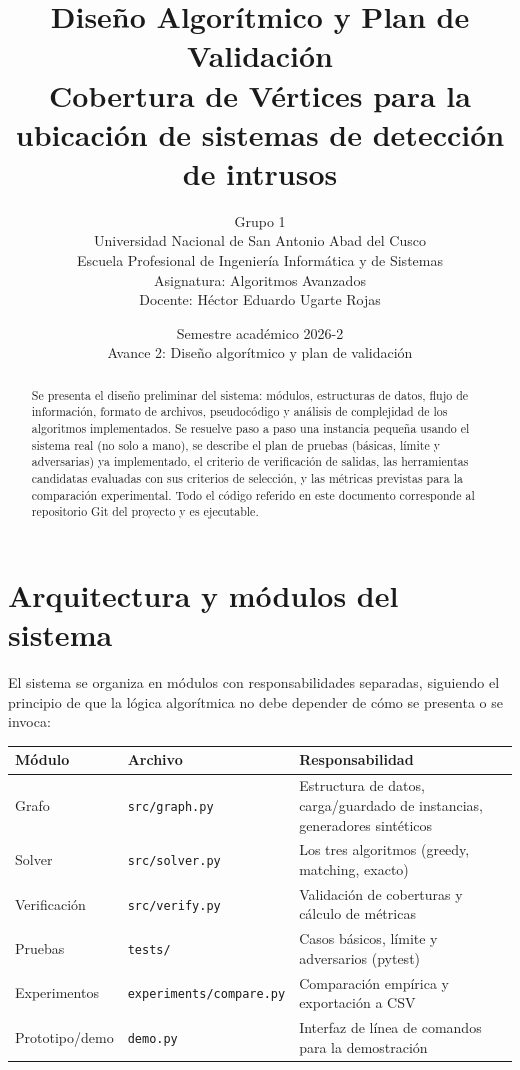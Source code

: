 \documentclass[11pt,a4paper]{article}
\title{
	\vspace{-1.5cm}
	\textbf{Diseño Algorítmico y Plan de Validación} \\
	\large Cobertura de Vértices para la ubicación de sistemas de detección de intrusos
}
\author{
	Grupo 1 \\
	\small Universidad Nacional de San Antonio Abad del Cusco \\
	\small Escuela Profesional de Ingeniería Informática y de Sistemas \\
	\small Asignatura: Algoritmos Avanzados \\
	\small Docente: Héctor Eduardo Ugarte Rojas
}
\date{Semestre académico 2026-2 \\ Avance 2: Diseño algorítmico y plan de validación}
\begin{document}
\maketitle
\thispagestyle{fancy}

\begin{abstract}
\noindent
Se presenta el diseño preliminar del sistema: módulos, estructuras de datos, flujo de
información, formato de archivos, pseudocódigo y análisis de complejidad de los algoritmos
implementados. Se resuelve paso a paso una instancia pequeña usando el sistema real (no solo
a mano), se describe el plan de pruebas (básicas, límite y adversarias) ya implementado, el
criterio de verificación de salidas, las herramientas candidatas evaluadas con sus criterios
de selección, y las métricas previstas para la comparación experimental. Todo el código
referido en este documento corresponde al repositorio Git del proyecto y es ejecutable.
\end{abstract}

\section{Arquitectura y módulos del sistema}

El sistema se organiza en módulos con responsabilidades separadas, siguiendo el principio de
que la lógica algorítmica no debe depender de cómo se presenta o se invoca:

\begin{center}
\begin{tabular}{p{2.6cm}p{3.6cm}p{7.5cm}}
	\toprule
	\textbf{Módulo} & \textbf{Archivo} & \textbf{Responsabilidad} \\
	\midrule
	Grafo & \texttt{src/graph.py} & Estructura de datos, carga/guardado de instancias, generadores sintéticos \\
	Solver & \texttt{src/solver.py} & Los tres algoritmos (greedy, matching, exacto) \\
	Verificación & \texttt{src/verify.py} & Validación de coberturas y cálculo de métricas \\
	Pruebas & \texttt{tests/} & Casos básicos, límite y adversarios (pytest) \\
	Experimentos & \texttt{experiments/\allowbreak compare.py} & Comparación empírica y exportación a CSV \\
	Prototipo/demo & \texttt{demo.py} & Interfaz de línea de comandos para la demostración \\
	\bottomrule
\end{tabular}
\end{center}
\end{document}
